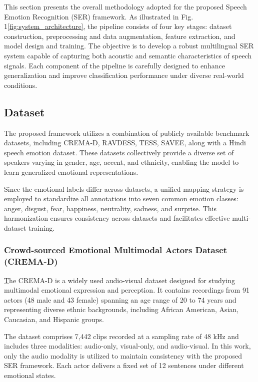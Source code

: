 \documentclass[iicol,sn-mathphys-num]{sn-jnl}%
\theoremstyle{thmstyleone}%
\theoremstyle{thmstyletwo}%
\theoremstyle{thmstylethree}%
\begin{document}
This section presents the overall methodology adopted for the proposed Speech Emotion Recognition (SER) framework. As illustrated in Fig. 1\ref {fig:system_architecture}, the pipeline consists of four key stages: dataset construction, preprocessing and data augmentation, feature extraction, and model design and training. The objective is to develop a robust multilingual SER system capable of capturing both acoustic and semantic characteristics of speech signals. Each component of the pipeline is carefully designed to enhance generalization and improve classification performance under diverse real-world conditions.

\subsection{Dataset}\label{subsec3.1}
The proposed framework utilizes a combination of publicly available benchmark datasets, including CREMA-D, RAVDESS, TESS, SAVEE,\cite{r25, r26, r27, r28} along with a Hindi speech emotion dataset. These datasets collectively provide a diverse set of speakers varying in gender, age, accent, and ethnicity, enabling the model to learn generalized emotional representations.

Since the emotional labels differ across datasets, a unified mapping strategy is employed to standardize all annotations into seven common emotion classes: anger, disgust, fear, happiness, neutrality, sadness, and surprise. This harmonization ensures consistency across datasets and facilitates effective multi-dataset training.


\subsubsection{Crowd-sourced Emotional Multimodal Actors Dataset (CREMA-D)}\label{subsubsec3.1.1}
\href{https://www.kaggle.com/datasets/ejlok1/cremad}
The CREMA-D is a widely used audio-visual dataset designed for studying multimodal emotional expression and perception. It contains recordings from 91 actors (48 male and 43 female) spanning an age range of 20 to 74 years and representing diverse ethnic backgrounds, including African American, Asian, Caucasian, and Hispanic groups.

The dataset comprises 7,442 clips recorded at a sampling rate of 48 kHz and includes three modalities: audio-only, visual-only, and audio-visual. In this work, only the audio modality is utilized to maintain consistency with the proposed SER framework. Each actor delivers a fixed set of 12 sentences under different emotional states.
\end{document}
